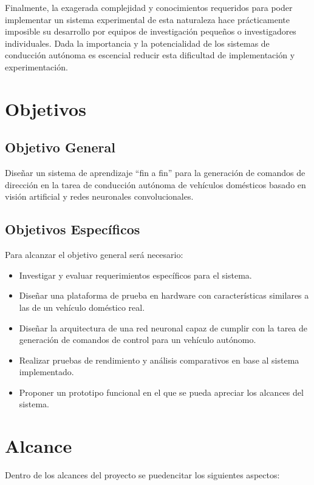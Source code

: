 \documentclass[12pt,letterpaper]{article}
\begin{document}
Finalmente, la exagerada complejidad y conocimientos requeridos para poder implementar un sistema experimental 
de esta naturaleza hace prácticamente imposible su desarrollo por equipos de investigación pequeños o investigadores 
individuales. Dada la importancia y la potencialidad de los sistemas de conducción autónoma es escencial reducir 
esta dificultad de implementación y experimentación.

\section{Objetivos}
\subsection{Objetivo General}

Diseñar un sistema de aprendizaje “fin a fin” para la generación de comandos de 
dirección en la tarea de conducción autónoma de vehículos domésticos basado en 
visión artificial y redes neuronales convolucionales.

\subsection{Objetivos Específicos}
Para alcanzar el objetivo general será necesario:

\begin{itemize}
    \item Investigar y evaluar requerimientos específicos para el sistema.
    \item Diseñar una plataforma de prueba en hardware con características similares a las de un vehículo doméstico real.
    \item Diseñar la arquitectura de una red neuronal capaz de cumplir con la tarea de generación de comandos 
    de control para un vehículo autónomo.
    \item Realizar pruebas de rendimiento y análisis comparativos en base al sistema implementado.
    \item Proponer un prototipo funcional en el que se pueda apreciar los alcances del sistema.
\end{itemize}


\section{Alcance}

Dentro de los alcances del proyecto se puedencitar los siguientes
aspectos:
\end{document}
